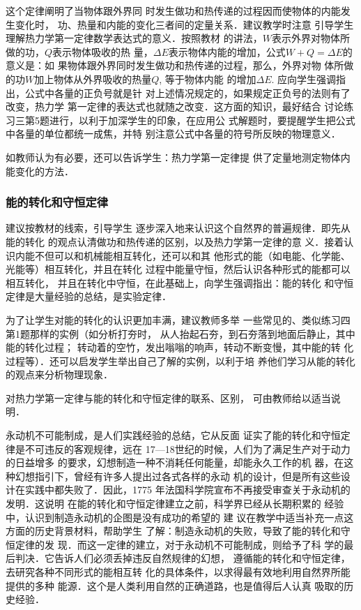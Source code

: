 这个定律阐明了当物体跟外界同
时发生做功和热传递的过程因而使物体的内能发生变化时，
功、热量和内能的变化三者间的定量关系．建议教学时注意
引导学生理解热力学第一定律数学表达式的意义．按照教材
的讲法，$W$表示外界对物体所做的功，$Q$表示物体吸收的热
量，$\Delta E$表示物体内能的增加，公式$W+Q=\Delta E$的意义是：如
果物体跟外界同时发生做功和热传递的过程，那么，外界对物
体所做的功$W$加上物体从外界吸收的热量$Q$, 等于物体内能
的增加$\Delta E$. 应向学生强调指出，公式中各量的正负号就是针
对上述情况规定的，如果规定正负号的法则有了改变，热力学
第一定律的表达式也就随之改变．这方面的知识，最好结合
讨论练习三第5题进行，以利于加深学生的印象，在应用公
式解题时，要提醒学生把公式中各量的单位都统一成焦，并特
别注意公式中各量的符号所反映的物理意义．

如教师认为有必要，还可以告诉学生：热力学第一定律提
供了定量地测定物体内能变化的方法．

\subsubsection{能的转化和守恒定律}

建议按教材的线索，引导学生
逐步深入地来认识这个自然界的普遍规律．即先从能的转化
的观点认清做功和热传递的区别，以及热力学第一定律的意
义．接着认识内能不但可以和机械能相互转化，还可以和其
他形式的能（如电能、化学能、光能等）相互转化，并且在转化
过程中能量守恒，然后认识各种形式的能都可以相互转化，
并且在转化中守恒，在此基础上，向学生强调指出：能的转化
和守恒定律是大量经验的总结，是实验定律．

为了让学生对能的转化的认识更加丰满，建议教师多举
一些常见的、类似练习四第1题那样的实例（如分析打夯时，
从人抬起石夯，到石夯落到地面后静止，其中能的转化过程；
转动着的空竹，发出嗡嗡的响声，转动不断变慢，其中能的转
化过程等）．还可以启发学生举出自己了解的实例，以利于培
养他们学习从能的转化的观点来分析物理现象．

对热力学第一定律与能的转化和守恒定律的联系、区别，
可由教师给以适当说明．

永动机不可能制成，是人们实践经验的总结，它从反面
证实了能的转化和守恒定律是不可违反的客观规律，远在
17—18世纪的时候，人们为了满足生产对于动力的日益增多
的要求，幻想制造一种不消耗任何能量，却能永久工作的机
器，在这种幻想指引下，曾经有许多人提出过各式各样的永动
机的设计，但是所有这些设计在实践中都失败了．因此，1775
年法国科学院宣布不再接受审查关于永动机的发明．这说明
在能的转化和守恒定律建立之前，科学界已经从长期积累的
经验中，认识到制造永动机的企图是没有成功的希望的 建
议在教学中适当补充一点这方面的历史背景材料，帮助学生
了解：制造永动机的失败，导致了能的转化和守恒定律的发
现．而这一定律的建立，对于永动机不可能制成，则给予了科
学的最后判决．它告诉人们必须丢掉违反自然规律的幻想，
遵循能的转化和守恒定律，去研究各种不同形式的能相互转
化的具体条件，以求得最有效地利用自然界所能提供的多种
能源．这个是人类利用自然的正确道路，也是值得后人认真
吸取的历史经验．

